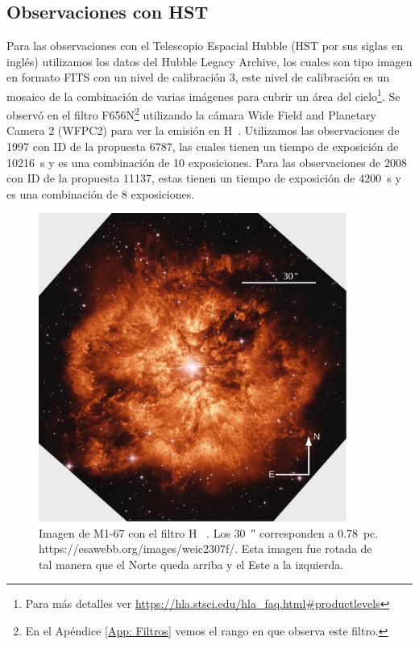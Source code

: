 \documentclass{book}
\begin{document}
\subsection{Observaciones con HST}

Para las observaciones con el Telescopio Espacial Hubble (HST por sus siglas en inglés) utilizamos los datos del Hubble Legacy Archive, los cuales son tipo imagen en formato FITS con un nivel de calibración 3, este nivel de calibración es un mosaico de la combinación de varias imágenes para cubrir un área del cielo\footnote{Para más detalles ver \url{https://hla.stsci.edu/hla_faq.html\#productlevels}}.  Se observó en el filtro F656N\footnote{En el Apéndice \ref{App: Filtros} vemos el rango en que observa este filtro.} utilizando la cámara Wide Field and Planetary Camera 2 (WFPC2) para ver la emisión en \unit{H\alpha}. Utilizamos las observaciones de 1997 con ID de la propuesta 6787, las cuales tienen un tiempo de exposición de \SI{10 216}{s} y es una combinación de 10 exposiciones. Para las observaciones de 2008 con ID de la propuesta 11137, estas tienen un tiempo de exposición de \SI{4200}{s} y es una combinación de 8 exposiciones. %

\begin{figure}[htb]
    \centering
    \includegraphics[width=0.9\textwidth]{ultimas correcciones/WR124_HST.pdf}
    \caption{Imagen de M1-67 con el filtro \unit{H\alpha} \citep{Grosdidier:1998}. Los \SI{30}{\arcsecond} corresponden a \SI{0.78}{pc}. https://esawebb.org/images/weic2307f/. Esta imagen fue rotada de tal manera que el Norte queda arriba y el Este a la izquierda.}
    \label{fig:M1-67HST}
\end{figure}
\end{document}
